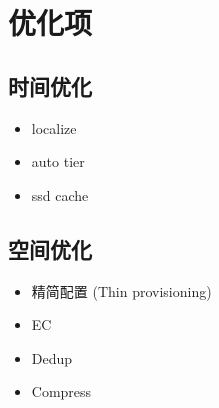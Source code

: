 \chapter{优化项}

\section{时间优化}

\begin{itemize}
    \item localize
    \item auto tier
    \item ssd cache
\end{itemize}

\section{空间优化}

\begin{itemize}
    \item 精简配置 (Thin provisioning)
    \item EC
    \item Dedup
    \item Compress
\end{itemize}


